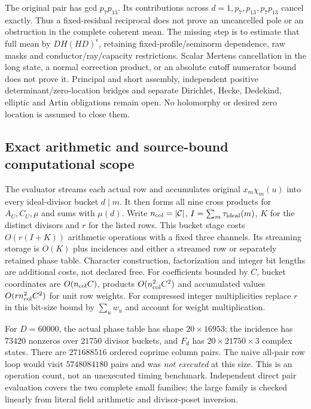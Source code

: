 The original pair has gcd $p_7p_{13}$. Its contributions across
$d=1,p_7,p_{13},p_7p_{13}$ cancel exactly. Thus a fixed-residual
reciprocal does not prove an uncancelled pole or an obstruction in the
complete coherent mean. The missing step is to estimate that full mean
by $DH(HD)^\epsilon$, retaining fixed-profile/seminorm dependence,
raw masks and conductor/ray/capacity restrictions. Scalar Mertens
cancellation in the long state, a normal correction product, or an
absolute cutoff numerator bound does not prove it. Principal and short
assembly, independent positive determinant/zero-location bridges and
separate Dirichlet, Hecke, Dedekind, elliptic and Artin obligations remain
open. No holomorphy or desired zero location is assumed to close them.

\subsection{Exact arithmetic and source-bound computational scope}
The evaluator streams each actual row and accumulates original
$x_m\chi_m(u)$ into every ideal-divisor bucket $d\mid m$. It then
forms all nine cross products for $A_U,C_U,\mu$ and sums with $\mu(d)$.
Write $n_{\rm col}=|\mathcal C|$,
$I=\sum_m\tau_{\rm ideal}(m)$, $K$ for the distinct divisors and $r$
for the listed rows. This bucket stage costs $O(r(I+K))$ arithmetic operations with a
fixed three channels. Its streaming storage is $O(K)$ plus incidences
and either a streamed row or separately retained phase table.
Character construction, factorization and integer bit lengths are
additional costs, not declared free.
For coefficients bounded by $C$, bucket coordinates are $O(n_{\rm col}C)$,
products $O(n_{\rm col}^2C^2)$ and accumulated values
$O(r n_{\rm col}^2C^2)$ for unit row
weights. For compressed integer multiplicities replace $r$ in this
bit-size bound by $\sum_u w_u$ and account for weight multiplication.

For $D=60000$, the actual phase table has shape $20\times16953$;
the incidence has $73420$ nonzeros over $21750$ divisor buckets, and
$F_d$ has $20\times21750\times3$ complex states.
There are $271688516$ ordered coprime column pairs.
The naive all-pair row loop would visit $5748084180$ pairs and was
\emph{not executed} at this size. This is an operation count, not an
unexecuted timing benchmark. Independent direct pair evaluation covers
the two complete small families; the large family is checked linearly
from literal field arithmetic and divisor-poset inversion.

